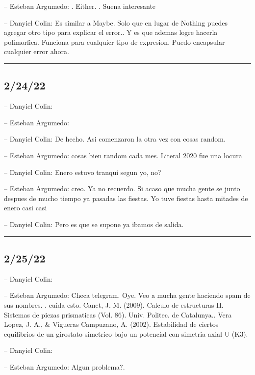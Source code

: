 -- Esteban Argumedo: . Either. . Suena interesante

-- Danyiel Colin: Es similar a Maybe. Solo que en lugar de Nothing
puedes agregar otro tipo para explicar el error.. Y es que ademas logre
hacerla polimorfica. Funciona para cualquier tipo de expresion. Puedo
encapsular cualquier error ahora.

\begin{center}\rule{0.5\linewidth}{0.5pt}\end{center}

\hypertarget{section-16}{%
\subsection{2/24/22}\label{section-16}}

-- Danyiel Colin:

-- Esteban Argumedo:

-- Danyiel Colin: De hecho. Asi comenzaron la otra vez con cosas random.

-- Esteban Argumedo: cosas bien random cada mes. Literal 2020 fue una
locura

-- Danyiel Colin: Enero estuvo tranqui segun yo, no?

-- Esteban Argumedo: creo. Ya no recuerdo. Si acaso que mucha gente se
junto despues de mucho tiempo ya pasadas las fiestas. Yo tuve fiestas
hasta mitades de enero casi casi

-- Danyiel Colin: Pero es que se supone ya ibamos de salida.

\begin{center}\rule{0.5\linewidth}{0.5pt}\end{center}

\hypertarget{section-17}{%
\subsection{2/25/22}\label{section-17}}

-- Danyiel Colin:

-- Esteban Argumedo: Checa telegram. Oye. Veo a mucha gente haciendo
spam de sus nombres. . cuida esto. Canet, J. M. (2009). Calculo de
estructuras II. Sistemas de piezas prismaticas (Vol. 86). Univ. Politec.
de Catalunya.. Vera Lopez, J. A., \& Vigueras Campuzano, A. (2002).
Estabilidad de ciertos equilibrios de un girostato simetrico bajo un
potencial con simetria axial U (K3).

-- Danyiel Colin:

-- Esteban Argumedo: Algun problema?.

